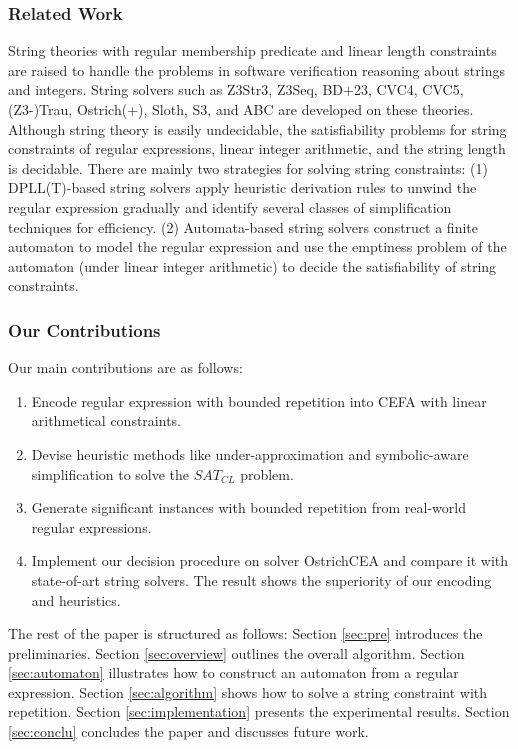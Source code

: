 {\subsubsection{Related Work}
String theories with regular membership predicate and linear length constraints are raised to handle the problems in software verification reasoning about strings and integers. String solvers such as Z3Str3\cite{z3str3}, Z3Seq\cite{z3seq}, BD+23\cite{BD+23}, CVC4\cite{cvc4}, CVC5\cite{cvc5}, (Z3-)Trau\cite{trau}\cite{z3trau}, Ostrich(+)\cite{ostrich}\cite{atva2020}, Sloth\cite{sloth}, S3\cite{s3}, and ABC\cite{abc} are developed on these theories. Although string theory is easily
undecidable\cite{undecidable_1}\cite{undecidable_2}, the satisfiability problems for string constraints of regular expressions, linear integer arithmetic, and the string length is decidable\cite{theory_BD+23}. There are mainly two strategies for solving string constraints: (1) DPLL(T)-based\cite{dpll_t} string solvers\cite{z3str3}\cite{cvc5} apply heuristic derivation rules to unwind the regular expression gradually and identify several classes of simplification techniques for efficiency. (2) Automata-based string solvers\cite{trau}\cite{z3trau}\cite{ostrich}\cite{atva2020}\cite{BD+23} construct a finite automaton to model the regular expression and use the emptiness problem of the automaton (under linear integer arithmetic) to decide the satisfiability of string constraints. 


\subsubsection{Our Contributions}
Our main contributions are as follows:
\begin{enumerate}
  \item  Encode regular expression with bounded repetition into CEFA with linear arithmetical constraints.
  \item  Devise heuristic methods like under-approximation and symbolic-aware simplification to solve the $SAT_{CL}$ problem.
  \item  Generate significant instances with bounded repetition from real-world regular expressions.
  \item  Implement our decision procedure on solver OstrichCEA and compare it with state-of-art string solvers. The result shows the superiority of our encoding and heuristics.
\end{enumerate}

The rest of the paper is structured as follows: Section \ref{sec:pre} introduces the preliminaries. Section \ref{sec:overview} outlines the overall algorithm. Section \ref{sec:automaton} illustrates how to construct an automaton from a regular expression. Section \ref{sec:algorithm} shows how to solve a string constraint with repetition. Section \ref{sec:implementation} presents the experimental results. Section \ref{sec:conclu} concludes the paper and discusses future work.
}


%